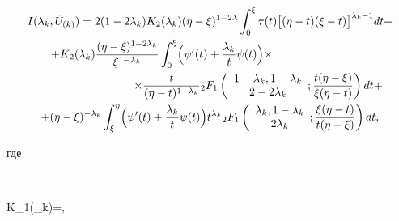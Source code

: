 \begin{multline*}

 I(\lambda_k,\tilde{U}_{(k)}) =

 2(1-2\lambda_k) K_2(\lambda_k) (\eta-\xi)^{1-2\lambda} \int _0^{\xi}\tau(t) \bigl[(\eta-t)(\xi-t)\bigr]^{\lambda_k-1}dt + \\

+K_2(\lambda_k) \frac{(\eta-\xi)^{1-2\lambda_k}}{\xi^{1-\lambda_k}}  \int _{0}^{\xi}

\Bigl( \psi'(t)+\frac{\lambda_k}{t} \psi(t) \Bigr) 

\times  \hspace{3cm}

\\

\hspace{3cm}

\times \frac{t}{(\eta-t)^{1-\lambda_k}}

{}_2 F_1 \left(

\begin{array}{c}

 1-\lambda_k, 1-\lambda_k\\

2-2\lambda_k

\end{array};

\frac{t(\eta-\xi)}{\xi(\eta-t)}

\right)

dt+\\

+(\eta-\xi)^{-\lambda_k}  \int _{\xi}^{\eta}

\Bigl( \psi'(t)+\frac{\lambda_k}{t} \psi(t)\Bigr)  t^{\lambda_k}

{}_2 F_1 \left(

\begin{array}{c}

 \lambda_k, 1-\lambda_k\\

2 \lambda_k

\end{array};

\frac{\xi(\eta-t)}{t(\eta-\xi)}

\right)dt,

\end{multline*}

где 

$$

K_1(\lambda_k)=,

